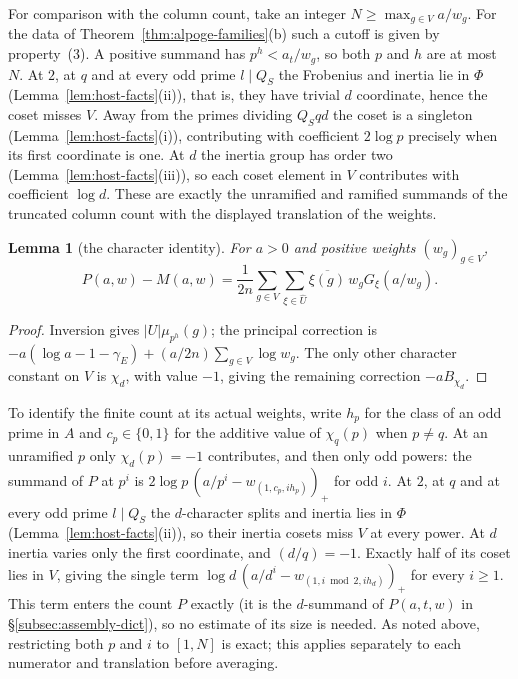 \documentclass[10pt]{amsart}
\newtheorem{lemma}[theorem]{Lemma}
\theoremstyle{definition}
\theoremstyle{remark}
\begin{document}
For comparison with the column count, take an integer
$N\ge\max_{g\in V}a/w_g$. For the data of Theorem~\ref{thm:alpoge-families}(b)
such a cutoff is given by property~(3). A positive summand has $p^h<a_t/w_g$,
so both $p$ and $h$ are at most $N$. At $2$, at $q$ and at every odd prime $l\mid Q_S$ the
Frobenius and inertia lie in $\Phi$ (Lemma~\ref{lem:host-facts}(ii)),
that is, they have trivial $d$ coordinate, hence the coset
misses $V$. Away from the primes dividing $Q_Sqd$ the coset is a singleton
(Lemma~\ref{lem:host-facts}(i)), contributing
with coefficient $2\log p$ precisely when its first coordinate is one.
At $d$ the inertia group has order two (Lemma~\ref{lem:host-facts}(iii)),
so each coset element in $V$ contributes with coefficient $\log d$. These are exactly the unramified
and ramified summands of the truncated column count with the displayed
translation of the weights.
\begin{lemma}[the character identity]\label{lem:character-identity}
For $a>0$ and positive weights $(w_g)_{g\in V}$,
\[
 P(a,w)-M(a,w)=\frac1{2n}\sum_{g\in V}\sum_{\xi\in\widehat U}
                   \overline{\xi(g)}\,w_gG_\xi(a/w_g).
\]
\end{lemma}
\begin{proof}
Inversion gives $|U|\mu_{p^h}(g)$; the principal correction
is $-a(\log a-1-\gamma_E)+(a/2n)\sum_{g\in V}\log w_g$.
The only other character constant on $V$ is $\chi_d$, with value
$-1$, giving the remaining correction $-aB_{\chi_d}$.
\end{proof}

To identify the finite count at its actual weights, write $h_p$ for
the class of an odd prime in $A$ and $c_p\in\{0,1\}$ for the
additive value of $\chi_q(p)$ when $p\ne q$. At an unramified
$p$ only $\chi_d(p)=-1$ contributes, and then only odd powers:
the summand of $P$ at $p^i$ is
$2\log p\,(a/p^i-w_{(1,c_p,i h_p)})_+$ for odd $i$.
At $2$, at $q$ and at every odd prime $l\mid Q_S$ the $d$-character
splits and inertia lies in $\Phi$ (Lemma~\ref{lem:host-facts}(ii)), so their
inertia cosets miss $V$ at every power. At $d$ inertia varies
only the first coordinate, and $(d/q)=-1$. Exactly half of its coset
lies in $V$, giving the single term
$\log d\,(a/d^i-w_{(1,i\bmod2,i h_d)})_+$ for every $i\ge1$.
This term enters the count $P$ exactly (it is the $d$-summand of
$P(a,t,w)$ in \S\ref{subsec:assembly-dict}), so no estimate of its size is
needed. As noted above, restricting both $p$ and $i$ to $[1,N]$ is exact;
this applies separately to each numerator and translation before averaging.
\end{document}
